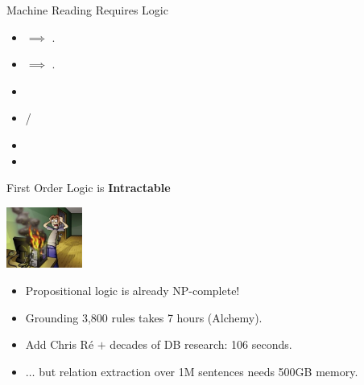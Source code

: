 \begin{frame}{Machine Reading Requires Logic}

\begin{itemize}
\item {} $\implies$ .
\item {} $\implies$ .
\end{itemize}
\vspace{1ex}
\pause

\begin{itemize}
\item {}
\item {} / 
\end{itemize}
\vspace{1ex}
\pause

\begin{itemize}
\item {}
\item {}
\end{itemize}

\end{frame}


\begin{frame}{First Order Logic is \textbf{Intractable}}
\begin{center}
  \includegraphics[height=2cm]{../img/overheating.jpg}
\end{center}

\begin{itemize}
  \item Propositional logic is already NP-complete!
\end{itemize}
\vspace{1ex}
\pause

\begin{itemize}
  \item Grounding 3,800 rules takes 7 hours (Alchemy).
  \pause
  \item Add Chris R\'{e} $+$ decades of DB research: 106 seconds.
  \item $\dots$ but relation extraction over 1M sentences needs 500GB memory.
\end{itemize}
\vspace{1ex}
\pause


\end{frame}


